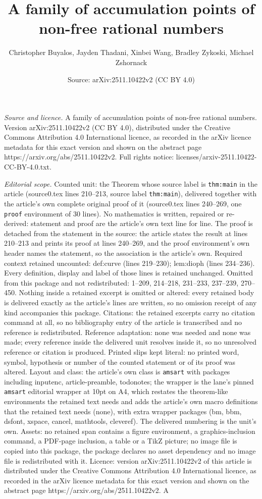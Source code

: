 \documentclass[10pt,a4paper]{amsart}
\title[A family of accumulation points of non-free rational numbers]{A family of accumulation points of non-free rational numbers}
\author{Christopher Buyalos, Jayden Thadani, Xinbei Wang, Bradley Zykoski, Michael Zshornack}
\date{Source: arXiv:2511.10422v2 (CC BY 4.0)}
\begin{document}
\maketitle

\noindent\emph{Source and licence.} A family of accumulation points of non-free rational numbers. Version arXiv:2511.10422v2 (CC BY 4.0), distributed under the Creative Commons Attribution 4.0 International licence, as recorded in the arXiv licence metadata for this exact version and shown on the abstract page https://arxiv.org/abs/2511.10422v2. Full rights notice: licenses/arxiv-2511.10422-CC-BY-4.0.txt.\par\smallskip

\noindent\textit{Editorial scope.} Counted unit: the Theorem whose source label is \texttt{thm:main} in the article (source0.tex lines 210--213, source label \texttt{thm:main}), delivered together with the article's own complete original proof of it (source0.tex lines 240--269, one \texttt{proof} environment of 30 lines). No mathematics is written, repaired or re-derived: statement and proof are the article's own text line for line. The proof is detached from the statement in the source: the article states the result at lines 210--213 and prints its proof at lines 240--269, and the proof environment's own header names the statement, so the association is the article's own. Required context retained uncounted: def:curve (lines 219--230); lem:dioph (lines 234--236). Every definition, display and label of those lines is retained unchanged. Omitted from this package and not redistributed: 1--209, 214--218, 231--233, 237--239, 270--450. Nothing inside a retained excerpt is omitted or altered: every retained body is delivered exactly as the article's lines are written, so no omission receipt of any kind accompanies this package. Citations: the retained excerpts carry no citation command at all, so no bibliography entry of the article is transcribed and no reference is redistributed. Reference adaptation: none was needed and none was made; every reference inside the delivered unit resolves inside it, so no unresolved reference or citation is produced. Printed slips kept literal: no printed word, symbol, hypothesis or number of the counted statement or of its proof was altered. Layout and class: the article's own class is \texttt{amsart} with packages including inputenc, article-preamble, todonotes; the wrapper is the lane's pinned \texttt{amsart} editorial wrapper at 10pt on A4, which restates the theorem-like environments the retained text needs and adds the article's own macro definitions that the retained text needs (none), with extra wrapper packages (bm, bbm, dsfont, xspace, cancel, mathtools, cleveref). The delivered numbering is the unit's own. Assets: no retained span contains a figure environment, a graphics-inclusion command, a PDF-page inclusion, a table or a TikZ picture; no image file is copied into this package, the package declares no asset dependency and no image file is redistributed with it. Licence: version arXiv:2511.10422v2 of this article is distributed under the Creative Commons Attribution 4.0 International licence, as recorded in the arXiv licence metadata for this exact version and shown on the abstract page https://arxiv.org/abs/2511.10422v2. A 
\end{document}
